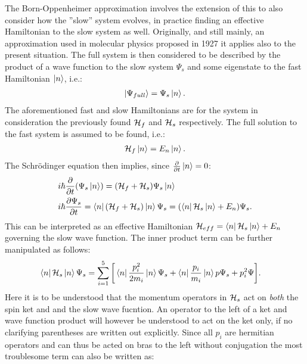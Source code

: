 \documentclass[a4paper]{article}
\begin{document}
The Born-Oppenheimer approximation involves the extension of this to also consider how the
''slow'' system evolves, in practice finding an effective Hamiltonian to the slow system as
well. Originally, and still mainly, an approximation used in molecular physics proposed in
1927 \cite{bo} it applies also to the present situation. The full system is then considered to be described by the product of a wave function to the slow
system \(\Psi_s\) and  some eigenstate to the fast Hamiltonian \(\ket{n}\), i.e.:
\begin{align*}
        \ket{\Psi_{full}} = \Psi_s\ket{n}
.\end{align*}
The aforementioned fast and slow Hamiltonians are for the system in consideration the
previously found \(\mathbb{\cal H}_f\) and \(\mathbb{\cal H}_s\) respectively. The full
solution to the fast system is assumed to be found, i.e.:
\begin{align*}
        \mathbb{\cal H}_f \ket{n} = E_n\ket{n}
.\end{align*}
The Schrödinger equation then implies, since \(\frac{\partial }{\partial t} \ket{n} = 0\):
\begin{align*}
        &i\hbar{}\frac{\partial }{\partial t} (\Psi_s\ket{n}) = (\mathbb{\cal H}_f +
        \mathbb{\cal H}_s) \Psi_s\ket{n}\\
        &i\hbar{}\frac{\partial \Psi_s}{\partial t} = \bra{n}(\mathbb{\cal H}_f +
        \mathbb{\cal H}_s)\ket{n}\Psi_s = (\bra{n}\mathbb{\cal H}_s\ket{n} +
        E_n)\Psi_s
.\end{align*}
This can be interpreted as an effective Hamiltonian \(\mathbb{\cal H}_{eff} =
\bra{n}\mathbb{\cal H}_s\ket{n} + E_n\) governing the slow wave function.
The inner product term can be further manipulated as follows:
\begin{align*}
        \bra{n} \mathbb{\cal H}_s \ket{n} \Psi_s &= \sum_{i=1}^{5} \bigg[\bra{n}
        \frac{p_i^2}{2m_i}\ket{n} \Psi_s + \bra{n} \frac{p_i}{m_i} \ket{n}
        p\Psi_s + p_i^2\Psi\bigg]
.\end{align*}
Here it is to be understood that the momentum operators in \(\mathbb{\cal H}_s\) act on
\textit{both} the spin ket and
and the slow wave fucntion. An operator to the left of a ket and wave function product will
however be understood to act on the ket only, if no clarifying parentheses are written out
explicitly.
Since all \(p_i\) are hermitian operators and can thus be acted on bras to the left
without conjugation the most troublesome term can also be
written as: %
\end{document}
